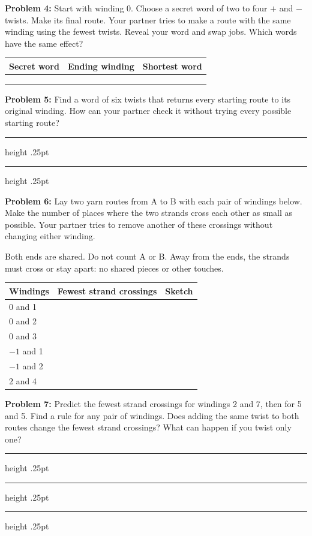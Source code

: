 \documentclass[11pt,letterpaper]{article}
\newcommand{\problem}[2]{\textbf{Problem #1:} #2\par}
\newcommand{\answerline}{\par\vspace{.32in}\hrule height .25pt}
\begin{document}
\problem{4}{Start with winding 0. Choose a secret word of two to four $+$ and $-$ twists. Make its final route. Your partner tries to make a route with the same winding using the fewest twists. Reveal your word and swap jobs. Which words have the same effect?}

\begin{center}\end{center}
\vspace{.1in}
\par\begin{tabular}{@{}p{.35\linewidth}p{.25\linewidth}p{.28\linewidth}@{}}
Secret word & Ending winding & Shortest word\\\hline
 & & \\[.28in]\hline
 & & \\[.28in]\hline
 & & \\[.28in]\hline
\end{tabular}\par
\vspace{.12in}

\problem{5}{Find a word of six twists that returns every starting route to its original winding. How can your partner check it without trying every possible starting route?}

\answerline\answerline

\newpage

\problem{6}{Lay two yarn routes from A to B with each pair of windings below. Make the number of places where the two strands cross each other as small as possible. Your partner tries to remove another of these crossings without changing either winding.}

Both ends are shared. Do not count A or B. Away from the ends, the strands must cross or stay apart: no shared pieces or other touches.
\vspace{.12in}
\par\begin{tabular}{@{}p{.2\linewidth}p{.26\linewidth}p{.44\linewidth}@{}}
Windings & Fewest strand crossings & Sketch\\\hline
0 and 1 & & \\[.62in]\hline
0 and 2 & & \\[.62in]\hline
0 and 3 & & \\[.62in]\hline
$-1$ and 1 & & \\[.62in]\hline
$-1$ and 2 & & \\[.62in]\hline
2 and 4 & & \\[.62in]\hline
\end{tabular}\par
\vspace{.17in}

\problem{7}{Predict the fewest strand crossings for windings 2 and 7, then for 5 and 5. Find a rule for any pair of windings. Does adding the same twist to both routes change the fewest strand crossings? What can happen if you twist only one?}

\answerline\answerline\answerline
\end{document}
